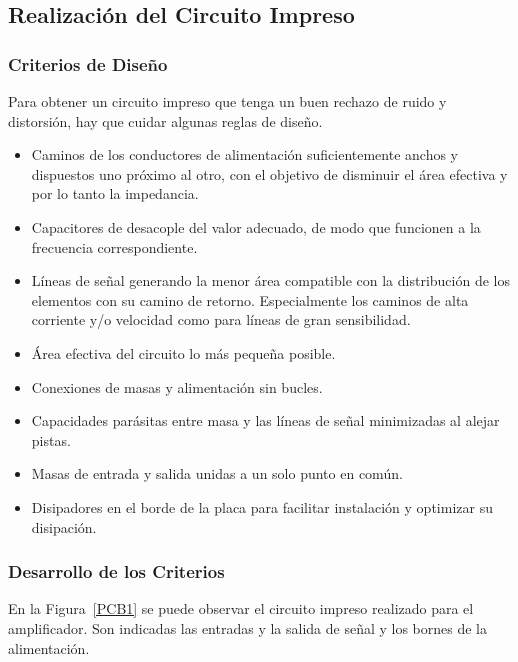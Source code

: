 \subsection{Realización del Circuito Impreso}
\bigskip 
\subsubsection{Criterios de Diseño}
Para obtener un circuito impreso que tenga un buen rechazo de ruido y distorsión, hay que cuidar algunas reglas de diseño.
\begin{itemize}
\bigskip 

\item  Caminos de los conductores de alimentación suficientemente anchos y  dispuestos uno próximo al otro, con el objetivo de disminuir el área efectiva y por lo tanto la impedancia.

\item Capacitores de desacople del valor adecuado, de modo que funcionen a la frecuencia correspondiente.

\item Líneas de señal generando la menor área compatible con la distribución de los elementos con su camino de retorno. Especialmente los caminos de alta corriente y/o velocidad como para líneas de gran sensibilidad.

\item Área efectiva del circuito lo más pequeña posible.

\item Conexiones de masas y alimentación sin bucles.

\item Capacidades parásitas entre masa y las líneas de señal minimizadas al alejar pistas.

\item Masas de entrada y salida unidas a un solo punto en común.

\item Disipadores en el borde de la placa para facilitar instalación y optimizar su disipación.

\end{itemize}
\subsubsection{Desarrollo de los Criterios}

En la Figura~\ref{PCB1} se puede observar el circuito impreso realizado para el amplificador. Son indicadas las entradas y la salida de señal y los bornes de la alimentación. 

